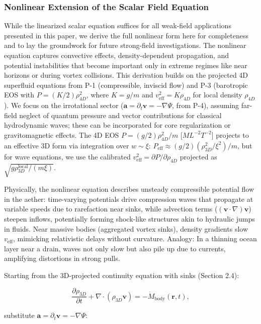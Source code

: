 \documentclass{article}
\begin{document}
\subsubsection{Nonlinear Extension of the Scalar Field Equation}

While the linearized scalar equation suffices for all weak-field applications presented in this paper, we derive the full nonlinear form here for completeness and to lay the groundwork for future strong-field investigations. The nonlinear equation captures convective effects, density-dependent propagation, and potential instabilities that become important only in extreme regimes like near horizons or during vortex collisions. This derivation builds on the projected 4D superfluid equations from P-1 (compressible, inviscid flow) and P-3 (barotropic EOS with $P = (K/2) \rho_{4D}^2$, where $K = g/m$ and $v_{\text{eff}}^2 = K \rho_{4D}$ for local density $\rho_{4D}$). We focus on the irrotational sector ($\mathbf{a} = \partial_t \mathbf{v} = -\nabla \Psi$, from P-4), assuming far-field neglect of quantum pressure and vector contributions for classical hydrodynamic waves; these can be incorporated for core regularization or gravitomagnetic effects. The 4D EOS $P = (g/2) \rho_{4D}^2 / m$ [$M L^{-2} T^{-2}$] projects to an effective 3D form via integration over $w \sim \xi$: $P_{\text{eff}} \approx (g/2) (\rho_{3D}^2 / \xi^2) / m$, but for wave equations, we use the calibrated $v_{\text{eff}}^2 = \partial P / \partial \rho_{4D}$ projected as $\sqrt{g \rho_{3D}^{\text{local}} / (m \xi)}$.

Physically, the nonlinear equation describes unsteady compressible potential flow in the aether: time-varying potentials drive compression waves that propagate at variable speeds due to rarefaction near sinks, while advection terms ($( \mathbf{v} \cdot \nabla ) \mathbf{v}$) steepen inflows, potentially forming shock-like structures akin to hydraulic jumps in fluids. Near massive bodies (aggregated vortex sinks), density gradients slow $v_{\text{eff}}$, mimicking relativistic delays without curvature. Analogy: In a thinning ocean layer near a drain, waves not only slow but also pile up due to currents, amplifying distortions in strong pulls.

Starting from the 3D-projected continuity equation with sinks (Section 2.4):

\[
\frac{\partial \rho_{3D}}{\partial t} + \nabla \cdot (\rho_{3D} \mathbf{v}) = -\dot{M}_{\text{body}}(\mathbf{r}, t),
\]

substitute $\mathbf{a} = \partial_t \mathbf{v} = -\nabla \Psi$:
\end{document}
